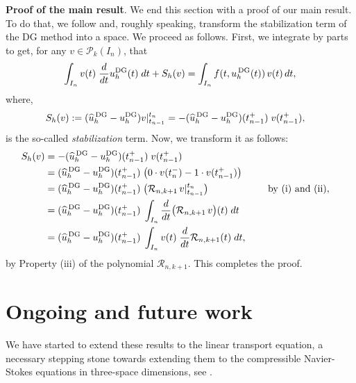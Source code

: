 \documentclass[bpam,reqno]{ipart}
\begin{document}
{\bf Proof of the main result}.
 We end this section with a proof of our main result.
To do that, we follow \cite{Cockburn23} and, roughly speaking, transform the stabilization term of the DG method into a space. We proceed as follows. First, we integrate by parts to get, for any $v \in \mathcal{P}_k(I_n)$, that
\begin{alignat*}{2}
\int_{I_n}  v(t)\;\frac{d}{dt} u^{{\rm DG}}_h(t)\;dt + S_h(v)=
\int_{I_n}  f(t, u^{\,{\rm DG}}_h(t)) \,v(t)\,dt,
\end{alignat*}
where,
\begin{alignat*}{2}
 S_h(v)&:=(\widehat{u}^{\,{\rm DG}}_h-u^{{\rm DG}}_h) v |_{t_{n-1}}^{t_n}
=-(\widehat{u}^{\,{\rm DG}}_h-u^{{\rm DG}}_h)(t^+_{n-1})\; v(t_{n-1}^+),
 \end{alignat*}
 is the so-called {\em stabilization} term.
 Now, we transform it as follows:
 \begin{alignat*}{2}
 S_h(v)&=-(\widehat{u}^{\,{\rm DG}}_h-u^{{\rm DG}}_h)(t^+_{n-1})\; v(t_{n-1}^+)
 \\
 &=(\widehat{u}^{\,{\rm DG}}_h-u^{{\rm DG}}_h)(t^+_{n-1})\; \big (0\cdot v(t_n^-)-1\cdot v(t_{n-1}^+)\big )
 \\
 &=(\widehat{u}^{\,{\rm DG}}_h-u^{{\rm DG}}_h)(t^+_{n-1})\; \big (\mathcal{R}_{n,k+1}\,v|_{t_{n-1}}^{t_n}\big )&&\quad\text{ by (i) and (ii)},
 \\
 &=(\widehat{u}^{\,{\rm DG}}_h-u^{{\rm DG}}_h)(t^+_{n-1})\; \int_{I_n} \frac{d}{dt}\big(\mathcal{R}_{n,k+1}\,v\big)(t)\; dt
 \\
 &=(\widehat{u}^{\,{\rm DG}}_h-u^{{\rm DG}}_h)(t^+_{n-1}) \; \int_{I_n}  v(t)\;\frac{d}{dt}\mathcal{R}_{n,k+1}(t) \;dt,
\end{alignat*}
by Property (iii) of the polynomial $\mathcal{R}_{n,k+1}$. This completes the proof.





 



\section{Ongoing and future work}
\label{sec:ongoingwork}
We have started to extend these results to the linear transport equation,
a necessary stepping stone towards extending them to the compressible 
Navier-Stokes equations in three-space dimensions, see \cite{LalCandlerCockburn23}.
\end{document}
